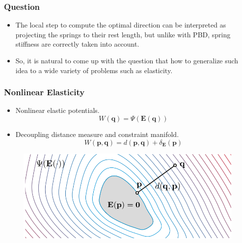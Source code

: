 \documentclass[serif,mathserif]{beamer}
\begin{document}

\begin{frame}
  \frametitle{Question}
  \begin{itemize}
   \item The local step to compute the optimal direction can be interpreted as projecting the springs to their 
   rest length, but unlike with PBD, spring stiffness are correctly taken into account.
   \item So, it is natural to come up with the question that how to generalize such idea to a wide variety of problems 
   such as elasticity.
  \end{itemize}
\end{frame}


\begin{frame}
  \frametitle{Nonlinear Elasticity}
  \begin{itemize}
    \item Nonlinear elastic potentials.
      \begin{equation*}
	W(\mathbf{q}) = \Psi(\mathbf{E}(\mathbf{q}))
      \end{equation*}
    \item Decoupling distance measure and constraint manifold.
      \begin{equation*}
       W(\mathbf{p}, \mathbf{q})=d(\mathbf{p}, \mathbf{q})+\delta_{\mathbf{E}}(\mathbf{p})
      \end{equation*}
  \end{itemize}
  \begin{figure}[t]
      \centering
      \includegraphics[scale=0.3]{pic/strain_manifold.png}
  \end{figure}
\end{frame}
\end{document}
